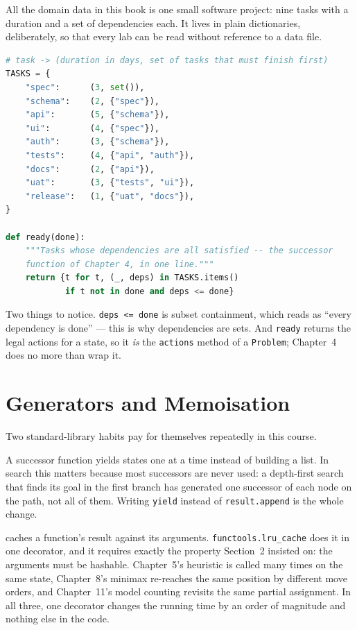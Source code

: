 All the domain data in this book is one small software project: nine tasks with a
duration and a set of dependencies each. It lives in plain dictionaries,
deliberately, so that every lab can be read without reference to a data file.

\begin{examplebox}
\begin{lstlisting}[language=Python]
# task -> (duration in days, set of tasks that must finish first)
TASKS = {
    "spec":      (3, set()),
    "schema":    (2, {"spec"}),
    "api":       (5, {"schema"}),
    "ui":        (4, {"spec"}),
    "auth":      (3, {"schema"}),
    "tests":     (4, {"api", "auth"}),
    "docs":      (2, {"api"}),
    "uat":       (3, {"tests", "ui"}),
    "release":   (1, {"uat", "docs"}),
}

def ready(done):
    """Tasks whose dependencies are all satisfied -- the successor
    function of Chapter 4, in one line."""
    return {t for t, (_, deps) in TASKS.items()
            if t not in done and deps <= done}
\end{lstlisting}
Two things to notice. \texttt{deps <= done} is subset containment, which reads as
``every dependency is done'' --- this is why dependencies are sets. And
\texttt{ready} returns the legal actions for a state, so it \emph{is} the
\texttt{actions} method of a \texttt{Problem}; Chapter~4 does no more than wrap it.
\end{examplebox}

\section{Generators and Memoisation}

Two standard-library habits pay for themselves repeatedly in this course.

A  successor function yields states one at a time instead of
building a list. In search this matters because most successors are never used: a
depth-first search that finds its goal in the first branch has generated one
successor of each node on the path, not all of them. Writing \texttt{yield} instead
of \texttt{result.append} is the whole change.

 caches a function's result against its arguments.
\texttt{functools.lru\_cache} does it in one decorator, and it requires exactly the
property Section~2 insisted on: the arguments must be hashable. Chapter~5's
heuristic is called many times on the same state, Chapter~8's minimax re-reaches
the same position by different move orders, and Chapter~11's model counting
revisits the same partial assignment. In all three, one decorator changes the
running time by an order of magnitude and nothing else in the code.

